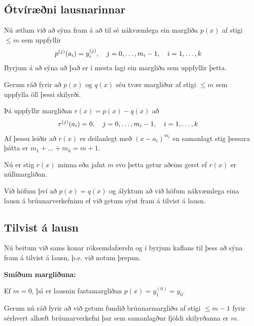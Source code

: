 \documentclass[letterpaper,10pt,icelandic]{sphinxmanual}
\begin{document}
\subsection{Ótvíræðni lausnarinnar}
\label{kafli03:otviraeni-lausnarinnar}
Nú ætlum við að sýna fram á að til sé nákvæmlega ein margliða
\(p(x)\) af stigi \(\leq m\) sem uppfyllir
\begin{gather}
\begin{split}p^{(j)}(a_i) = y_i^{(j)},
  \quad j = 0, \ldots, m_i-1, \quad i = 1, \ldots, k\end{split}\notag
\end{gather}
Byrjum á að sýna að það er í mesta lagi ein margliða sem uppfyllir þetta.

Gerum ráð fyrir að
\(p(x)\) og \(q(x)\) séu tvær margliður af stigi \(\leq m\)
sem uppfylla öll þessi skilyrði.

Þá uppfyllir margliðan \(r(x) = p(x) - q(x)\) að
\begin{gather}
\begin{split}r^{(j)}(a_i) = 0, \quad j = 0, \ldots, m_i-1,
  \quad i = 1, \ldots,k\end{split}\notag
\end{gather}
Af þessu leiðir að \(r(x)\) er deilanlegt með \((x-a_i)^{m_i}\)
en samanlagt stig þessara þátta er \(m_1 + \ldots + m_k = m + 1\).

Nú er stig \(r(x)\) minna eða jafnt \(m\) svo þetta getur aðeins
gerst ef \(r(x)\) er núllmargliðan.

Við höfum því að \(p(x) = q(x)\) og ályktum að við höfum nákvæmlega
eina lausn á brúunarverkefninu ef við getum sýnt fram á tilvist á lausn.


\subsection{Tilvist á lausn}
\label{kafli03:tilvist-a-lausn}
Nú beitum við sams konar röksemdafærslu og í byrjum kaflans til þess að sýna
fram á tilvist á lausn, þ.e. við notum þrepun.

\textbf{Smíðum margliðuna:}

Ef \(m = 0\), þá er lausnin fastamargliðan
\(p(x) = y_1^{(0)}=y_0\).

Gerum nú ráð fyrir að við getum fundið brúunarmargliðu af stigi
\(\leq m-1\) fyrir sérhvert alhæft brúunarverkefni þar sem
samanlagður fjöldi skilyrðanna er \(m\).
\end{document}
